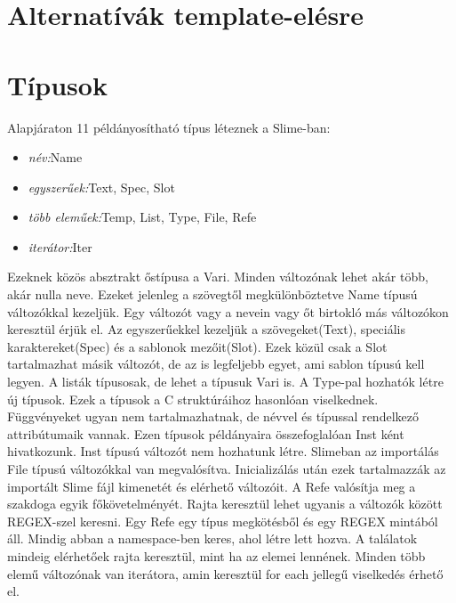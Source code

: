 \section{Alternatívák template-elésre }


\section{Típusok}
Alapjáraton 11 példányosítható típus léteznek a Slime-ban:
\begin{itemize}
\item \emph{név:}Name
\item \emph{egyszerűek:}Text, Spec, Slot
\item \emph{több eleműek:}Temp, List, Type, File, Refe
\item \emph{iterátor:}Iter
\end{itemize}
Ezeknek közös absztrakt őstípusa a Vari.
Minden változónak lehet akár több, akár nulla neve.
Ezeket jelenleg a szövegtől megkülönböztetve Name típusú változókkal kezeljük.
Egy változót vagy a nevein vagy őt birtokló más változókon keresztül érjük el.
Az egyszerűekkel kezeljük a szövegeket(Text), speciális karaktereket(Spec) és a sablonok mezőit(Slot).
Ezek közül csak a Slot tartalmazhat másik változót, de az is legfeljebb egyet, ami sablon típusú kell legyen.
A listák típusosak, de lehet a típusuk Vari is. 
A Type-pal hozhatók létre új típusok.
Ezek a típusok a C struktúráihoz hasonlóan viselkednek.
Függvényeket ugyan nem tartalmazhatnak, de névvel és típussal rendelkező attribútumaik vannak.
Ezen típusok példányaira összefoglalóan Inst ként hivatkozunk.
Inst típusú változót nem hozhatunk létre.
Slimeban az importálás File típusú változókkal van megvalósítva.
Inicializálás után ezek tartalmazzák az importált Slime fájl kimenetét és elérhető változóit.
A Refe valósítja meg a szakdoga egyik főkövetelményét.
Rajta keresztül lehet ugyanis a változók között REGEX-szel keresni.
Egy Refe egy típus megkötésből és egy REGEX mintából áll.
Mindig abban a namespace-ben keres, ahol létre lett hozva.
A találatok mindeig elérhetőek rajta keresztül, mint ha az elemei lennének.
Minden több elemű változónak van iterátora, amin keresztül for each jellegű viselkedés érhető el.



